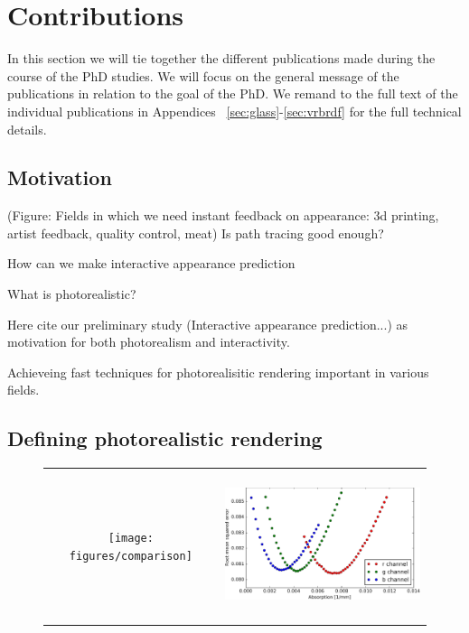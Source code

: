 \chapter{Contributions}

In this section we will tie together the different publications made during the course of the PhD studies. We will focus on the general message of the publications in relation to the goal of the PhD. We remand to the full text of the individual publications in Appendices~ \ref{sec:glass}-\ref{sec:vrbrdf} for the full technical details.

\section{Motivation}
(Figure: Fields in which we need instant feedback on appearance: 3d printing, artist feedback, quality control, meat)
Is path tracing good enough?

How can we make interactive appearance prediction

What is photorealistic?

Here cite our preliminary study (Interactive appearance prediction...) as motivation for both photorealism and interactivity.

Achieveing fast techniques for photorealisitic rendering important in various fields.


\section{Defining photorealistic rendering}
\begin{figure}
\begin{tabular}{@{}c@{}c@{}}
	 \texttt{[image: figures/comparison]} & \hspace{2em}
	 \includegraphics[height=4.3cm]{figures/glass_bowl_analysis_by_synthesis}  \\
\end{tabular}
\caption{} %
\label{fig:teaser}
\end{figure}


